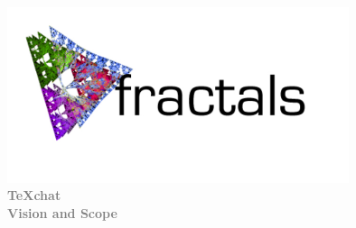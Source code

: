 \documentclass[11pt,a4paper]{moderncv}
\begin{document}
		\fontsize{36pt}{36pt}\selectfont
		\begin{center}
		\includegraphics[width=10cm]{./logo2.jpg}
			\textbf{\textcolor{gray}{\\TeXchat}}
			\textbf{\textcolor{gray}{\\Vision and Scope}}
		\vspace*{\fill}
		\end{center}
\end{document}
